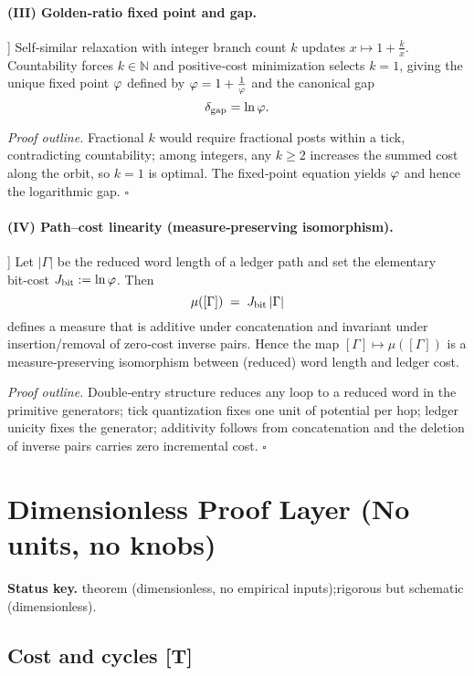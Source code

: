 \documentclass[11pt]{article}
\begin{document}
\paragraph{(III) Golden‑ratio fixed point and gap.}
\begin{theorem}[Fixed point and gap \,[T]]
Self‑similar relaxation with integer branch count $k$ updates $x\mapsto 1+\tfrac{k}{x}$. Countability forces $k\in\mathbb{N}$ and positive‑cost minimization selects $k=1$, giving the unique fixed point $\varphi$ defined by $\varphi=1+\tfrac1{\varphi}$ and the canonical gap
\[
\delta_{\mathrm{gap}}=\ln\varphi.
\]
\end{theorem}
\noindent\emph{Proof outline.} Fractional $k$ would require fractional posts within a tick, contradicting countability; among integers, any $k\ge2$ increases the summed cost along the orbit, so $k=1$ is optimal. The fixed‑point equation yields $\varphi$ and hence the logarithmic gap. \hfill$\square$

\paragraph{(IV) Path–cost linearity (measure‑preserving isomorphism).}
\begin{theorem}[Word length $\leftrightarrow$ ledger cost \,[T]]
Let $|\Gamma|$ be the reduced word length of a ledger path and set the elementary bit‑cost $J_{\text{bit}}:=\ln\varphi$. Then
\[
\mu([\Gamma])\;=\;J_{\text{bit}}\,|\Gamma|
\]
defines a measure that is additive under concatenation and invariant under insertion/removal of zero‑cost inverse pairs. Hence the map $[\Gamma]\mapsto\mu([\Gamma])$ is a measure‑preserving isomorphism between (reduced) word length and ledger cost.
\end{theorem}
\noindent\emph{Proof outline.} Double‑entry structure reduces any loop to a reduced word in the primitive generators; tick quantization fixes one unit of potential per hop; ledger unicity fixes the generator; additivity follows from concatenation and the deletion of inverse pairs carries zero incremental cost. \hfill$\square$

\section{Dimensionless Proof Layer (No units, no knobs)}
\label{sec:dimless-layer}

\noindent\textbf{Status key.} \;[T] theorem (dimensionless, no empirical inputs);\; [R] rigorous but schematic (dimensionless).

\subsection{Cost and cycles \texorpdfstring{[$\mathbf T$]}{[T]}}
\label{subsec:cost-cycles}
\end{document}
